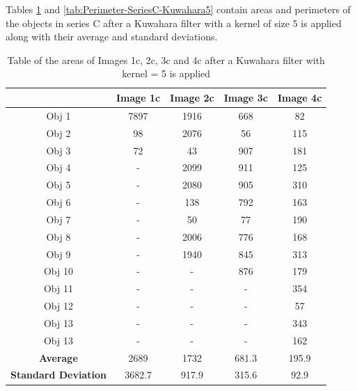 \documentclass[runningheads]{llncs}
\begin{document}
\newpage
Tables \ref{tab:Area-SeriesC-Kuwahara5} and \ref{tab:Perimeter-SeriesC-Kuwahara5} contain areas and perimeters of the objects in series C after a Kuwahara filter with a kernel of size 5 is applied along with their average and standard deviations.
\begin{table}[h!]
\centering
\begin{tabular}{|c|c|c|c|c|}
\hline
\textbf{} & \textbf{Image 1c} & \textbf{Image 2c} & \textbf{Image 3c} & \textbf{Image 4c} \\
\hline
Obj 1 & 7897    & 1916  & 668 &  82 \\ \hline
Obj 2 &  98     & 2076  & 56 & 115\\ \hline
Obj 3 &   72    & 43    & 907 &  181\\ \hline
Obj 4 &   -     & 2099  & 911 &  125\\ \hline
Obj 5 &   -     & 2080  & 905  &  310\\ \hline
Obj 6 &   -     & 138  &  792 &  163\\ \hline
Obj 7 &   -     &  50   & 77 &  190\\ \hline
Obj 8 &   -     &  2006  & 776 &  168 \\ \hline
Obj 9 &   -    &  1940     & 845    & 313\\ \hline
Obj 10 &  -          &  -     & 876    & 179\\ \hline
Obj 11 &   -     &  -  & - &  354 \\ \hline
Obj 12 &   -    &  -     & -    & 57\\ \hline
Obj 13 &  -          &  -     & -    & 343\\ \hline
Obj 13 &  -          &  -     & -    & 162\\ \hline
\textbf{Average} &   2689  &  1732   &   681.3   & 195.9  \\ \hline
\textbf{Standard Deviation} &  3682.7 &  917.9  &  315.6 & 92.9 \\ \hline
\end{tabular}
\caption{Table of the areas of Images 1c, 2c, 3c and 4c after a Kuwahara filter with kernel = 5 is applied}
\label{tab:Area-SeriesC-Kuwahara5}
\end{table}
\end{document}
